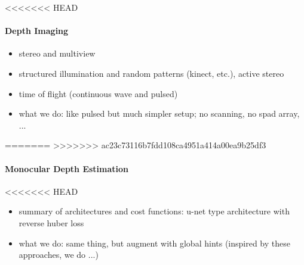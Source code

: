 <<<<<<< HEAD
\paragraph{Depth Imaging}

\begin{itemize}
	\item stereo and multiview
	\item structured illumination and random patterns (kinect, etc.), active stereo
	\item time of flight (continuous wave and pulsed)
	\item what we do: like pulsed but much simpler setup; no scanning, no spad array, ...
\end{itemize}
=======
>>>>>>> ac23c73116b7fdd108ca4951a414a00ea9b25df3


\paragraph{Monocular Depth Estimation}
<<<<<<< HEAD

\begin{itemize}
	\item summary of architectures and cost functions: u-net type architecture with reverse huber loss
	\item what we do: same thing, but augment with global hints (inspired by these approaches, we do ...)
\end{itemize}

